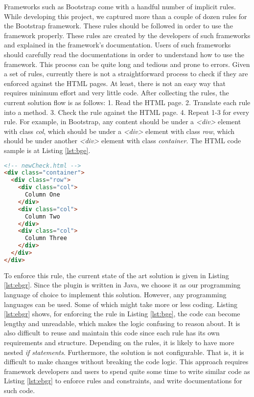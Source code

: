 \documentclass[conference]{IEEETran}
\begin{document}
Frameworks such as Bootstrap come with a handful number of implicit rules. While developing this project, we captured more than a couple of dozen rules for the Bootstrap framework. These rules should be followed in order to use the framework properly. These rules are created by the developers of such frameworks and explained in the framework’s documentation. Users of such frameworks should carefully read the documentations in order to understand how to use the framework. This process can be quite long and tedious and prone to errors. Given a set of rules, currently there is not a straightforward process to check if they are enforced against the HTML pages. At least, there is not an easy way that requires minimum effort and very little code. After collecting the rules, the current solution flow is as follows:
1. Read the HTML page. 
2. Translate each rule into a method. 
3. Check the rule against the HTML page.
4. Repeat 1-3 for every rule.
For example, in Bootstrap, any content should be under a \textit{<div>} element with class \textit{col}, which should be under a \textit{<div>} element with class \textit{row}, which should be under another \textit{<div>} element with class \textit{container}. The HTML code sample is at Listing \ref{lst:bge}.  

\begin{lstlisting}[language=HTML, caption=Bootstrap Grid Example, label={lst:bge}]
<!-- newCheck.html -->
<div class="container">
  <div class="row">
    <div class="col">
      Column One
    </div>
    <div class="col">
      Column Two
    </div>
    <div class="col">
      Column Three
    </div>
  </div>
</div>
\end{lstlisting}

To enforce this rule, the current state of the art solution is given in Listing \ref{lst:ebgr}. Since the plugin is written in Java, we choose it as our programming language of choice to implement this solution. However, any programming languages can be used. Some of which might take more or less coding. Listing \ref{lst:ebgr} shows, for enforcing the rule in Listing \ref{lst:bge}, the code can become lengthy and unreadable, which makes the logic confusing to reason about. It is also difficult to reuse and maintain this code since each rule has its own requirements and structure. Depending on the rules, it is likely to have more nested \textit{if statements}. Furthermore, the solution is not configurable. That is, it is difficult to make changes without breaking the code logic. This approach requires framework developers and users to spend quite some time to write similar code as Listing \ref{lst:ebgr} to enforce rules and constraints, and write documentations for such code.   
\end{document}
